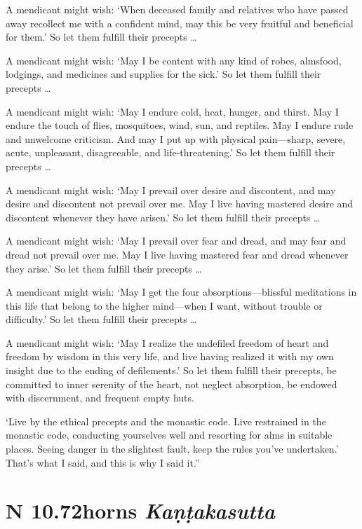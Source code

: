 \documentclass[12pt,openany]{book}%
\newcommand*{\suttatitleacronym}[1]{\smaller[2]{#1}\vspace*{.3em}}
\newcommand*{\suttatitletranslation}[1]{\linebreak{#1}}
\newcommand*{\suttatitleroot}[1]{\linebreak\smaller[2]\itshape{#1}}
\newcommand*{\tocacronym}[1]{\hspace*{-3.3em}{#1}\quad}
\newcommand*{\toctranslation}[1]{#1}
\newcommand*{\tocroot}[1]{(\textit{#1})}
\begin{document}
A mendicant might wish: ‘When deceased family and relatives who have passed away recollect me with a confident mind, may this be very fruitful and beneficial for them.’ So let them fulfill their precepts … 

A mendicant might wish: ‘May I be content with any kind of robes, almsfood, lodgings, and medicines and supplies for the sick.’ So let them fulfill their precepts … 

A mendicant might wish: ‘May I endure cold, heat, hunger, and thirst. May I endure the touch of flies, mosquitoes, wind, sun, and reptiles. May I endure rude and unwelcome criticism. And may I put up with physical pain—sharp, severe, acute, unpleasant, disagreeable, and life-threatening.’ So let them fulfill their precepts … 

A mendicant might wish: ‘May I prevail over desire and discontent, and may desire and discontent not prevail over me. May I live having mastered desire and discontent whenever they have arisen.’ So let them fulfill their precepts … 

A mendicant might wish: ‘May I prevail over fear and dread, and may fear and dread not prevail over me. May I live having mastered fear and dread whenever they arise.’ So let them fulfill their precepts … 

A mendicant might wish: ‘May I get the four absorptions—blissful meditations in this life that belong to the higher mind—when I want, without trouble or difficulty.’ So let them fulfill their precepts … 

A mendicant might wish: ‘May I realize the undefiled freedom of heart and freedom by wisdom in this very life, and live having realized it with my own insight due to the ending of defilements.’ So let them fulfill their precepts, be committed to inner serenity of the heart, not neglect absorption, be endowed with discernment, and frequent empty huts. 

‘Live by the ethical precepts and the monastic code. Live restrained in the monastic code, conducting yourselves well and resorting for alms in suitable places. Seeing danger in the slightest fault, keep the rules you’ve undertaken.’ That’s what I said, and this is why I said it.” 

%
\section*{{\suttatitleacronym AN 10.72}{\suttatitletranslation Thorns }{\suttatitleroot Kaṇṭakasutta}}
\addcontentsline{toc}{section}{\tocacronym{AN 10.72} \toctranslation{Thorns } \tocroot{Kaṇṭakasutta}}
\end{document}
